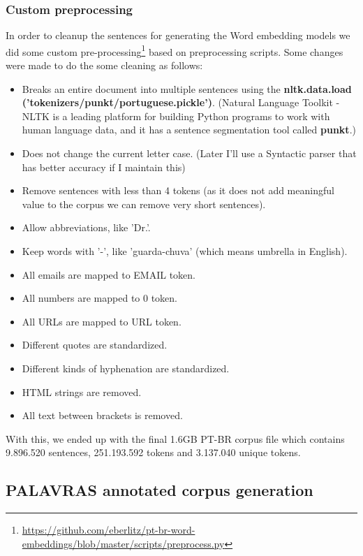 \subsubsection{Custom preprocessing}

In order to cleanup the sentences for generating the Word embedding models we did some custom pre-processing\footnote{\url{https://github.com/eberlitz/pt-br-word-embeddings/blob/master/scripts/preprocess.py}} based on  preprocessing scripts. Some changes were made to do the some cleaning as follows:

\begin{itemize}
    \item Breaks an entire document into multiple sentences using the 
    \textbf{nltk.data.load ('tokenizers/punkt/portuguese.pickle')}. (Natural Language Toolkit - NLTK is a leading platform for building Python programs to work with human language data, and it has a sentence segmentation tool called \textbf{punkt}.)
    \item Does not change the current letter case. (Later I'll use a Syntactic parser that has better accuracy if I maintain this)
    \item Remove sentences with less than 4 tokens (as it does not add meaningful value to the corpus we can remove very short sentences).
    \item Allow abbreviations, like 'Dr.'.
    \item Keep words with '-', like 'guarda-chuva' (which means umbrella in English).
    \item All emails are mapped to EMAIL token.
    \item All numbers are mapped to 0 token.
    \item All URLs are mapped to URL token.
    \item Different quotes are standardized.
    \item Different kinds of hyphenation are standardized.
    \item HTML strings are removed.
    \item All text between brackets is removed.
\end{itemize}

With this, we ended up with the final 1.6GB PT-BR corpus file which contains 9.896.520 sentences, 251.193.592 tokens and 3.137.040 unique tokens.


\subsection{PALAVRAS annotated corpus generation}\label{chap:methodsandmaterials:palavras}

